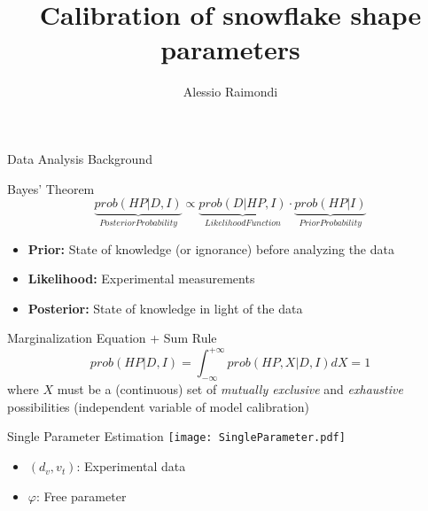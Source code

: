 \documentclass[11pt]{beamer}
\begin{document}
	\author{Alessio Raimondi}
	\title{Calibration of snowflake shape parameters}
	\begin{frame}[plain]
		\maketitle
	\end{frame}
		
	\begin{frame}{Data Analysis Background}
		\begin{block}{Bayes' Theorem}
			\begin{equation*}
				\underbrace{prob(HP|D,I)}_{Posterior Probability} \propto
				\underbrace{prob(D|HP,I)}_{Likelihood Function} \cdot \underbrace{prob(HP|I)}_{Prior Probability}
			\end{equation*}
			\begin{itemize}
				\item \textbf{Prior:} State of knowledge (or ignorance) before analyzing the data 
				
				\item \textbf{Likelihood:} Experimental measurements
				\item \textbf{Posterior:} State of knowledge in light of the data
			\end{itemize}
		\end{block}
		\begin{block}{Marginalization Equation + Sum Rule}
			\begin{equation*}
				prob(HP|D,I) = \int_{-\infty}^{+\infty} prob(HP,X|D,I) dX = 1
			\end{equation*}
			where $ X $ must be a (continuous) set of \textit{mutually exclusive} and \textit{exhaustive} possibilities (independent variable of model calibration)
		\end{block}
	\end{frame}

	\begin{frame}{Single Parameter Estimation}
		\centering
		\texttt{[image: SingleParameter.pdf]}
		\begin{itemize}
			\item $ (d_v, v_t) $: Experimental data
			\item $ \varphi $: Free parameter
		\end{itemize}
	\end{frame}
\end{document}
